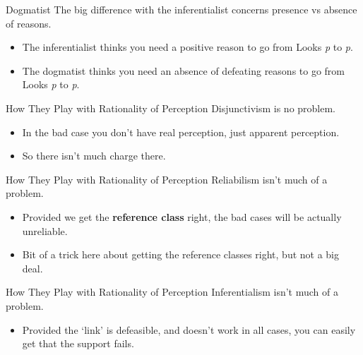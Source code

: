 \documentclass[
  17pt,
  letterpaper,
  ignorenonframetext,
  aspectratio=169,
  xcolor={dvipsnames}]{beamer}
\providecommand{\tightlist}{%
  \setlength{\itemsep}{0pt}\setlength{\parskip}{0pt}}\usepackage{longtable,booktabs,array}
\begin{document}
\begin{frame}{Dogmatist}
\protect\hypertarget{dogmatist-1}{}
The big difference with the inferentialist concerns presence vs absence
of reasons.

\begin{itemize}[<+->]
\tightlist
\item
  The inferentialist thinks you need a positive reason to go from Looks
  \emph{p} to \emph{p}.
\item
  The dogmatist thinks you need an absence of defeating reasons to go
  from Looks \emph{p} to \emph{p}.
\end{itemize}
\end{frame}

\begin{frame}{How They Play with Rationality of Perception}
\protect\hypertarget{how-they-play-with-rationality-of-perception}{}
Disjunctivism is no problem.

\begin{itemize}[<+->]
\tightlist
\item
  In the bad case you don't have real perception, just apparent
  perception.
\item
  So there isn't much charge there.
\end{itemize}
\end{frame}

\begin{frame}{How They Play with Rationality of Perception}
\protect\hypertarget{how-they-play-with-rationality-of-perception-1}{}
Reliabilism isn't much of a problem.

\begin{itemize}[<+->]
\tightlist
\item
  Provided we get the \textbf{reference class} right, the bad cases will
  be actually unreliable.
\item
  Bit of a trick here about getting the reference classes right, but not
  a big deal.
\end{itemize}
\end{frame}

\begin{frame}{How They Play with Rationality of Perception}
\protect\hypertarget{how-they-play-with-rationality-of-perception-2}{}
Inferentialism isn't much of a problem.

\begin{itemize}[<+->]
\tightlist
\item
  Provided the `link' is defeasible, and doesn't work in all cases, you
  can easily get that the support fails.
\end{itemize}
\end{frame}
\end{document}

